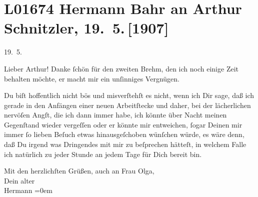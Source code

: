

\section[Hermann Bahr an Arthur Schnitzler, 19. 5. {[}1907{]}]{L01674 Hermann Bahr an Arthur Schnitzler, 19. 5. {[}1907{]}}
\nopagebreak{}
\rehead{ }\normalsize\beginnumbering{}
\toendnotes[C]{\smallbreak\pagebreak[2]}
\toendnotes[C]{\smallbreak}
\pstart
           \raggedleft{}{\pb}19. 5.\pend
           
\pstart{}Lieber Arthur!\pend\vspace{0.5em}
\pstart
           Danke ſchön für den zweiten Brehm, den ich noch
               einige Zeit behalten möchte, er macht mir ein unſinniges Vergnügen.\pend
           
\pstart
           Du biſt hoffentlich nicht bös und misverſtehſt es nicht, wenn ich Dir sage, daß ich
               gerade in den Anfängen einer neuen Arbeitſtecke und daher, bei der lächerlichen nervöſen
               Angſt, die ich dann immer habe, ich könnte über Nacht meinen Gegenſtand wieder
               vergeſſen oder er könnte mir entweichen, ſogar Deinen mir immer ſo lieben Beſuch
               etwas hinausgeſchoben {\pb}wünſchen würde, es wäre
               denn, daß Du irgend was Dringendes mit mir zu beſprechen hätteſt, in welchem Falle
               ich natürlich zu jeder Stunde an jedem Tage für Dich bereit bin.\pend
           
\pstart
           Mit den herzlichſten Grüßen, auch an Frau Olga,{\\[\baselineskip]}Dein alter{\\[\baselineskip]}\spacefill\mbox{Hermann}\pend
           \leftskip=0em{}\endnumbering{}  
      